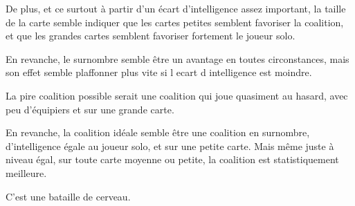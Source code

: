 De plus, et ce surtout à partir d'un écart d'intelligence assez important, la taille de la carte semble indiquer que les cartes petites semblent favoriser la coalition, et que les grandes cartes semblent favoriser fortement le joueur solo. 

En revanche, le surnombre semble être un avantage en toutes circonstances, mais son effet semble plaffonner plus vite si l ecart d intelligence est moindre.


\begin{result}
	La pire coalition possible serait une coalition qui joue quasiment au hasard, avec peu d'équipiers et sur une grande carte.
	
	En revanche, la coalition idéale semble être une coalition en surnombre, d'intelligence égale au joueur solo, et sur une petite carte. Mais même juste à niveau égal, sur toute carte moyenne ou petite, la coalition est statistiquement meilleure. 
	
	C'est une bataille de cerveau.
\end{result}

